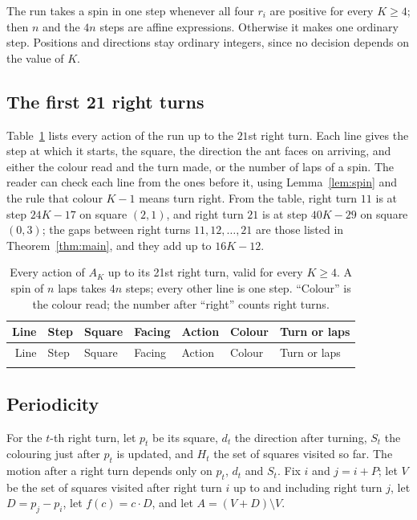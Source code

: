 \documentclass[11pt,a4paper]{article}
\theoremstyle{definition}
\theoremstyle{remark}
\begin{document}
The run takes a spin in one step whenever all four $r_i$ are positive for every $K \ge 4$; then $n$ and the
$4n$ steps are affine expressions. Otherwise it makes one ordinary step. Positions and directions stay
ordinary integers, since no decision depends on the value of $K$.

\subsection{The first 21 right turns}

Table~\ref{tab:cert35} lists every action of the run up to the $21$st right turn. Each line gives the step at
which it starts, the square, the direction the ant faces on arriving, and either the colour read and the turn
made, or the number of laps of a spin. The reader can check each line from the ones before it, using
Lemma~\ref{lem:spin} and the rule that colour $K-1$ means turn right. From the table, right turn $11$ is at
step $24K - 17$ on square $(2,1)$, and right turn $21$ is at step $40K - 29$ on square $(0,3)$; the gaps between
right turns $11, 12, \dots, 21$ are those listed in Theorem~\ref{thm:main}, and they add up to $16K - 12$.

\begin{center}
\small
\begin{longtable}{@{}rllllll@{}}
\caption{Every action of $A_K$ up to its 21st right turn, valid for every $K \ge 4$. A spin of $n$ laps takes
$4n$ steps; every other line is one step. ``Colour'' is the colour read; the number after ``right'' counts
right turns.}\label{tab:cert35}\\
\toprule
Line & Step & Square & Facing & Action & Colour & Turn or laps\\
\midrule
\endfirsthead
\toprule
Line & Step & Square & Facing & Action & Colour & Turn or laps\\
\midrule
\endhead
\bottomrule
\endfoot

\end{longtable}
\end{center}

\subsection{Periodicity}

For the $t$-th right turn, let $p_t$ be its square, $d_t$ the direction after turning, $S_t$ the colouring just
after $p_t$ is updated, and $H_t$ the set of squares visited so far. The motion after a right turn depends only
on $p_t$, $d_t$ and $S_t$. Fix $i$ and $j = i + P$; let $V$ be the set of squares visited after right turn $i$
up to and including right turn $j$, let $D = p_j - p_i$, let $f(c) = c \cdot D$, and let $A = (V + D) \setminus V$.
\end{document}
